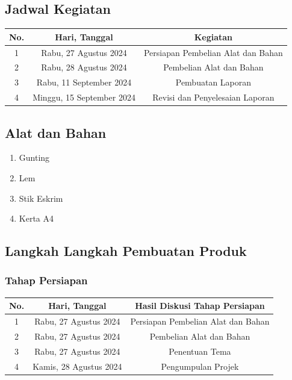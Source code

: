 \documentclass[a4paper,12pt]{article}
\begin{document}
 \subsection{Jadwal Kegiatan}
 \begin{table}[ht]
     \centering
     \begin{tabular}{|c|c|c|}
     \hline
     \rowcolor[HTML]{9B9B9B}
         No. & Hari, Tanggal  & Kegiatan \\ \hline
         1 & Rabu, 27 Agustus 2024  & Persiapan Pembelian Alat dan Bahan \\ \hline
         2 & Rabu, 28 Agustus 2024 & Pembelian Alat dan Bahan \\ \hline
         3 & Rabu, 11 September 2024 & Pembuatan Laporan\\ \hline
         4 & Minggu, 15 September 2024 & Revisi dan Penyelesaian Laporan\\ \hline
     \end{tabular}
 \end{table}
 \subsection{Alat dan Bahan}
 \begin{enumerate}
     \item Gunting
     \item Lem
     \item Stik Eskrim
     \item Kerta A4
 \end{enumerate}
 \subsection{Langkah Langkah Pembuatan Produk}
 \subsubsection{Tahap Persiapan}
 
 \begin{table}[ht]
     \centering
     \begin{tabular}{|c|c|c|}
     \hline
     \rowcolor[HTML]{9B9B9B}
         No. & Hari, Tanggal  & Hasil Diskusi Tahap Persiapan \\ \hline
         1 & Rabu, 27 Agustus 2024  & Persiapan Pembelian Alat dan Bahan \\ \hline
         2 & Rabu, 27 Agustus 2024 & Pembelian Alat dan Bahan \\ \hline
         3 & Rabu, 27 Agustus 2024 & Penentuan Tema\\ \hline
         4 & Kamis, 28 Agustus 2024 & Pengumpulan Projek\\ \hline
     \end{tabular}
 \end{table}
\end{document}
